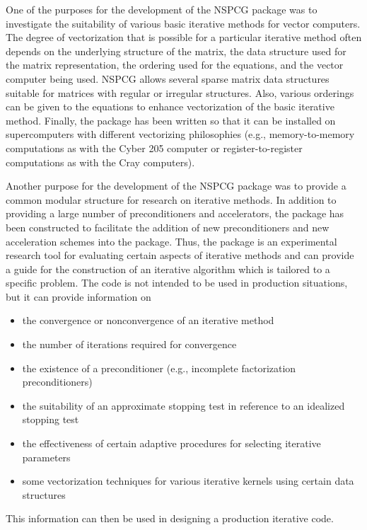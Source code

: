    One of the purposes for the development of the NSPCG package
was to investigate the suitability of various basic iterative
methods for vector computers.  The degree of vectorization that
is possible for a particular iterative method often depends on the
underlying structure of the matrix, the data structure used for
the matrix representation, the ordering used for the equations,
and the vector computer being used.  NSPCG allows several sparse
matrix data structures suitable for matrices with regular or
irregular structures.  Also, various orderings can be given to
the equations to enhance vectorization of the basic iterative
method.  Finally, the package has been written so that it can
be installed on supercomputers with different vectorizing 
philosophies (e.g., memory-to-memory computations as with the 
Cyber 205 computer or register-to-register computations as with 
the Cray computers).
 
   Another purpose for the development of the NSPCG package was
to provide a common modular structure for research on iterative
methods.  In addition to providing a large number of preconditioners
and accelerators, the package has been constructed to facilitate the
addition of new preconditioners and new acceleration schemes
into the package.  Thus, the package is an experimental research
tool for evaluating certain aspects of iterative methods and can
provide a guide for the construction of an iterative algorithm
which is tailored to a specific problem.  The code is not intended
to be used in production situations, but it can provide information
on
\bigskip
\begin{itemize}
  \item the convergence or nonconvergence of an iterative method
  \item the number of iterations required for convergence
  \item the existence of a preconditioner (e.g., incomplete
         factorization preconditioners)
  \item the suitability of an approximate stopping test in 
         reference to an idealized stopping test
  \item the effectiveness of certain adaptive procedures for
         selecting iterative parameters
  \item some vectorization techniques for various iterative
         kernels using certain data structures
\end{itemize}
\bigskip
This information can then be used in designing a production
iterative code.  

